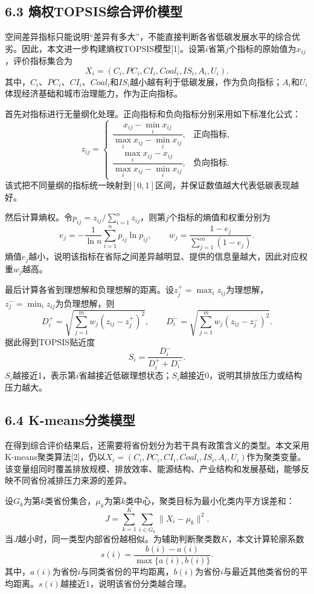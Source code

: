 \documentclass[UTF8,zihao=-4,fontset=windows]{ctexart}
\begin{document}
\subsection*{6.3 熵权TOPSIS综合评价模型}

空间差异指标只能说明“差异有多大”，不能直接判断各省低碳发展水平的综合优劣。因此，本文进一步构建熵权TOPSIS模型[1]。设第$i$省第$j$个指标的原始值为$x_{ij}$，评价指标集合为
\[
X_i=(C_i,PC_i,CI_i,Coal_i,IS_i,A_i,U_i).
\]
其中，$C_i$、$PC_i$、$CI_i$、$Coal_i$和$IS_i$越小越有利于低碳发展，作为负向指标；$A_i$和$U_i$体现经济基础和城市治理能力，作为正向指标。

首先对指标进行无量纲化处理。正向指标和负向指标分别采用如下标准化公式：
\[
z_{ij}=
\begin{cases}
\dfrac{x_{ij}-\min_i x_{ij}}{\max_i x_{ij}-\min_i x_{ij}}, & \text{正向指标},\\[8pt]
\dfrac{\max_i x_{ij}-x_{ij}}{\max_i x_{ij}-\min_i x_{ij}}, & \text{负向指标}.
\end{cases}
\]
该式把不同量纲的指标统一映射到$[0,1]$区间，并保证数值越大代表低碳表现越好。

然后计算熵权。令$p_{ij}=z_{ij}/\sum_{i=1}^{n}z_{ij}$，则第$j$个指标的熵值和权重分别为
\[
e_j=-\frac{1}{\ln n}\sum_{i=1}^{n}p_{ij}\ln p_{ij},\qquad
w_j=\frac{1-e_j}{\sum_{j=1}^{m}(1-e_j)}.
\]
熵值$e_j$越小，说明该指标在省际之间差异越明显、提供的信息量越大，因此对应权重$w_j$越高。

最后计算各省到理想解和负理想解的距离。设$z_j^+=\max_i z_{ij}$为理想解，$z_j^-=\min_i z_{ij}$为负理想解，则
\[
D_i^+=\sqrt{\sum_{j=1}^{m}w_j(z_{ij}-z_j^+)^2},\qquad
D_i^-=\sqrt{\sum_{j=1}^{m}w_j(z_{ij}-z_j^-)^2}.
\]
据此得到TOPSIS贴近度
\[
S_i=\frac{D_i^-}{D_i^++D_i^-}.
\]
$S_i$越接近1，表示第$i$省越接近低碳理想状态；$S_i$越接近0，说明其排放压力或结构压力越大。

\subsection*{6.4 K-means分类模型}

在得到综合评价结果后，还需要将省份划分为若干具有政策含义的类型。本文采用K-means聚类算法[2]，仍以$X_i=(C_i,PC_i,CI_i,Coal_i,IS_i,A_i,U_i)$作为聚类变量。该变量组同时覆盖排放规模、排放效率、能源结构、产业结构和发展基础，能够反映不同省份减排压力来源的差异。

设$G_k$为第$k$类省份集合，$\mu_k$为第$k$类中心，聚类目标为最小化类内平方误差和：
\[
J=\sum_{k=1}^{K}\sum_{i\in G_k}\|X_i-\mu_k\|^2.
\]
当$J$越小时，同一类型内部省份越相似。为辅助判断聚类数$K$，本文计算轮廓系数
\[
s(i)=\frac{b(i)-a(i)}{\max\{a(i),b(i)\}}.
\]
其中，$a(i)$为省份$i$与同类省份的平均距离，$b(i)$为省份$i$与最近其他类省份的平均距离。$s(i)$越接近1，说明该省份分类越合理。
\end{document}
